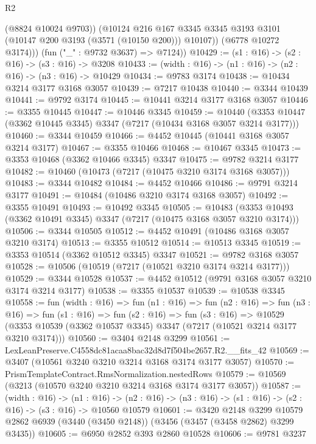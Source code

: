 \begin{lexlean}{R2}
\begin{coremodule}
              (@8824 @10024 @9703))
            (@10124
              @216
              @167
              @3345
              @3345
              @3193
              @3101
              (@10147 @200 @3193 (@3571 (@10150 @200)))
              @10107))
          (@6778 @10272 @3174)))
      (fun ("_" : @9732 @3637) => @7124))
@10429 := (s1 : @16) -> (s2 : @16) -> (s3 : @16) -> @3208
@10433 := (width : @16) -> (n1 : @16) -> (n2 : @16) -> (n3 : @16) -> @10429
@10434 := @9783 @3174
@10438 := @10434 @3214 @3177 @3168 @3057
@10439 := @7217 @10438
@10440 := @3344 @10439
@10441 := @9792 @3174
@10445 := @10441 @3214 @3177 @3168 @3057
@10446 := @3355 @10445
@10447 := @10446 @3345
@10459 := @10440 (@3353 @10447 (@3362 @10445 @3345) @3347 (@7217 (@10434 @3168 @3057 @3214 @3177)))
@10460 := @3344 @10459
@10466 := @4452 @10445 (@10441 @3168 @3057 @3214 @3177)
@10467 := @3355 @10466
@10468 := @10467 @3345
@10473 := @3353 @10468 (@3362 @10466 @3345) @3347
@10475 := @9782 @3214 @3177
@10482 := @10460 (@10473 (@7217 (@10475 @3210 @3174 @3168 @3057)))
@10483 := @3344 @10482
@10484 := @4452 @10466
@10486 := @9791 @3214 @3177
@10491 := @10484 (@10486 @3210 @3174 @3168 @3057)
@10492 := @3355 @10491
@10493 := @10492 @3345
@10505 := @10483 (@3353 @10493 (@3362 @10491 @3345) @3347 (@7217 (@10475 @3168 @3057 @3210 @3174)))
@10506 := @3344 @10505
@10512 := @4452 @10491 (@10486 @3168 @3057 @3210 @3174)
@10513 := @3355 @10512
@10514 := @10513 @3345
@10519 := @3353 @10514 (@3362 @10512 @3345) @3347
@10521 := @9782 @3168 @3057
@10528 := @10506 (@10519 (@7217 (@10521 @3210 @3174 @3214 @3177)))
@10529 := @3344 @10528
@10537 := @4452 @10512 (@9791 @3168 @3057 @3210 @3174 @3214 @3177)
@10538 := @3355 @10537
@10539 := @10538 @3345
@10558 := fun (width : @16) =>
  fun (n1 : @16) =>
  fun (n2 : @16) =>
  fun (n3 : @16) =>
  fun (s1 : @16) =>
  fun (s2 : @16) =>
  fun (s3 : @16) =>
  @10529 (@3353 @10539 (@3362 @10537 @3345) @3347 (@7217 (@10521 @3214 @3177 @3210 @3174)))
@10560 := @3404 @2148 @3299
@10561 := LexLeanPreserve.C4558dc81acaa8bac32d8d7f504be2657.R2.__fits_42
@10569 := @3407 (@10561 @3240 @3210 @3214 @3168 @3174 @3177 @3057)
@10570 := PrismTemplateContract.RmsNormalization.nestedRows
@10579 := @10569 (@3213 (@10570 @3240 @3210 @3214 @3168 @3174 @3177 @3057))
@10587 := (width : @16) ->
  (n1 : @16) -> (n2 : @16) -> (n3 : @16) -> (s1 : @16) -> (s2 : @16) -> (s3 : @16) -> @10560 @10579
@10601 := @3420
    @2148
    @3299
    @10579
    @2862
    @6939
    (@3440 (@3450 @2148))
    (@3456 (@3457 (@3458 @2862) @3299 @3435))
@10605 := @6950 @2852 @393 @2860 @10528
@10606 := @9781 @3237

\end{coremodule}
\end{lexlean}
